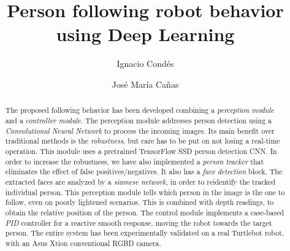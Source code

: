 \documentclass[11pt, a4paper]{svproc}
\title{Person following robot behavior using Deep Learning}
\author{Ignacio Condés
		\and José María Cañas}
\institute{Universidad Rey Juan Carlos}
\begin{document}
	\maketitle
	
	\begin{abstract}
		The proposed following behavior has been developed combining a \emph{perception module} and a \emph{controller module}. The perception module addresses person detection using a \emph{Convolutional Neural Network} to process the incoming images. Its main benefit over traditional methods is the \emph{robustness}, but care has to be put on not losing a real-time operation. This module uses a pretrained TensorFlow SSD person detection CNN. In order to increase the robustness, we have also implemented a \emph{person tracker} that eliminates the effect of false positives/negatives. It also has a \emph{face detection} block. The extracted faces are analyzed by a \emph{siamese network}, in order to reidentify the tracked individual person. This perception module tells which person in the image is the one to follow, even on poorly lightened scenarios. This is combined with depth readings, to obtain the relative position of the person. The control module implements a case-based \emph{PID} controller for a reactive smooth response, moving the robot towards the target person. The entire system has been experimentally validated on a real Turtlebot robot, with an Asus Xtion conventional RGBD camera.
	\end{abstract}

	
	
\end{document}
